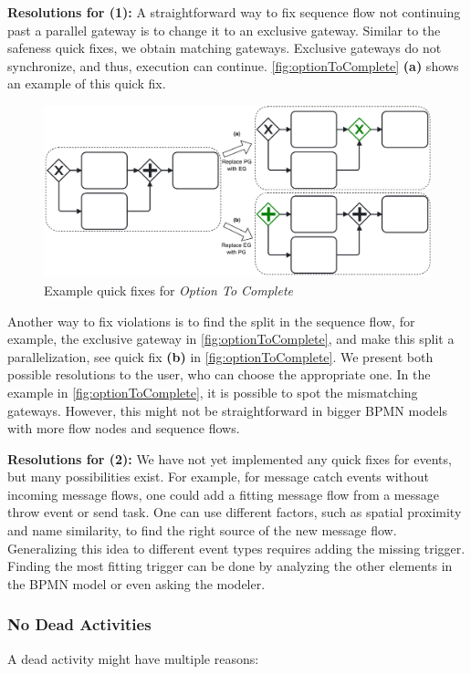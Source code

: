 \documentclass[runningheads]{llncs}
\begin{document}
\textbf{Resolutions for (1):} A straightforward way to fix sequence flow not continuing past a parallel gateway is to change it to an exclusive gateway.
Similar to the safeness quick fixes, we obtain matching gateways.
Exclusive gateways do not synchronize, and thus, execution can continue.
\autoref{fig:optionToComplete} \textbf{(a)} shows an example of this quick fix.

\begin{figure}[ht]
	\centering
	\includegraphics[width=1\textwidth]{images/optionToComplete}
	\caption{Example quick fixes for \textit{Option To Complete}}
	\label{fig:optionToComplete}
\end{figure}

Another way to fix violations is to find the split in the sequence flow, for example, the exclusive gateway in \autoref{fig:optionToComplete}, and make this split a parallelization, see quick fix \textbf{(b)} in \autoref{fig:optionToComplete}.
We present both possible resolutions to the user, who can choose the appropriate one.
In the example in \autoref{fig:optionToComplete}, it is possible to spot the mismatching gateways.
However, this might not be straightforward in bigger BPMN models with more flow nodes and sequence flows.

\textbf{Resolutions for (2):} We have not yet implemented any quick fixes for events, but many possibilities exist.
For example, for message catch events without incoming message flows, one could add a fitting message flow from a message throw event or send task.
One can use different factors, such as spatial proximity and name similarity, to find the right source of the new message flow.
Generalizing this idea to different event types requires adding the missing trigger.
Finding the most fitting trigger can be done by analyzing the other elements in the BPMN model or even asking the modeler.

\subsubsection{No Dead Activities}
A dead activity might have multiple reasons:
\end{document}
